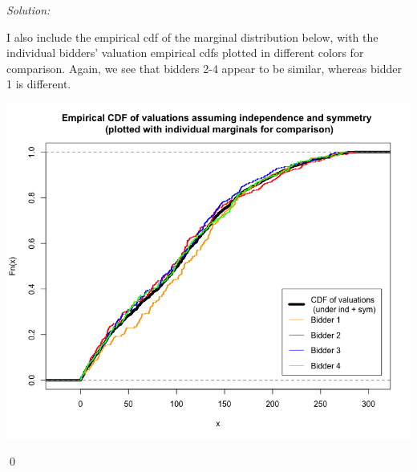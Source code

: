 \documentclass[12pt]{article}
\newenvironment{problem}[2][Problem]{\begin{trivlist}
\item[\hskip \labelsep {\bfseries #1}\hskip \labelsep {\bfseries #2.}]}{\end{trivlist}}
\newenvironment{sol}
    {\emph{Solution:}
    }
    {
    \qed
    }
\begin{document}
\begin{sol}
    I also include the empirical cdf of the marginal distribution below, with the individual bidders' valuation empirical cdfs plotted in different colors for comparison. Again, we see that bidders 2-4 appear to be similar, whereas bidder 1 is different.
    \begin{center}
        \includegraphics[scale=0.45]{CDF_val.png}
    \end{center}
\end{sol}
\begin{problem}{6}
\end{problem}
\end{document}
